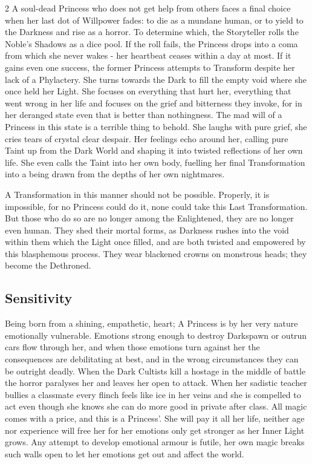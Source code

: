 \begin{multicols}{2}
A soul-dead Princess who does not get help from others faces a final choice when her last dot of Willpower fades: to die as a mundane human, or to yield to the Darkness and rise as a horror. To determine which, the Storyteller rolls the Noble’s Shadows as a dice pool. If the roll fails, the Princess drops into a coma from which she never wakes - her heartbeat ceases within a day at most. If it gains even one success, the former Princess attempts to Transform despite her lack of a Phylactery. She turns towards the Dark to fill the empty void where
she once held her Light. She focuses on everything that hurt her, everything that went wrong in her life and focuses on the grief and bitterness they invoke, for in her deranged state even that is better than nothingness. The mad will of a Princess in this state is a terrible thing to behold. She laughs with pure grief, she cries tears of crystal clear despair. Her feelings echo around her, calling pure Taint up from the Dark World and shaping it into twisted reflections of her own life. She even calls the Taint into her own body, fuelling her final Transformation into a being drawn from the depths of her own nightmares.

A Transformation in this manner should not be possible. Properly, it is impossible, for no Princess could do it, none could take this Last Transformation. But those who do so are no longer among the Enlightened, they
are no longer even human. They shed their mortal forms, as Darkness rushes into the void within them which the Light once filled, and are both twisted and empowered by this blasphemous process. They wear blackened crowns on monstrous heads; they become the Dethroned.

\subsection*{Sensitivity}
\label{subsec:Sensitivity}

Being born from a shining, empathetic, heart; A Princess is by her very nature‭ emotionally ‬vulnerable. Emotions strong enough to destroy Darkspawn or outrun cars flow through her, and when those emotions turn against her the consequences are debilitating‭ at best, and in the wrong circumstances they can be outright deadly. When the Dark Cultists kill a hostage in the middle of battle the horror paralyses her and leaves her open to attack. When her sadistic teacher bullies a classmate every flinch feels like ice in her veins and she is compelled to act even though she knows she can do more good in private after class. All magic comes with a price, and this is a Princess'. She will pay it all her life, neither age nor experience will free her for her emotions only get stronger as her Inner Light grows. Any attempt to develop emotional armour is futile, her own magic breaks such walls open to let her emotions get out and affect the world. 


\end{multicols}

